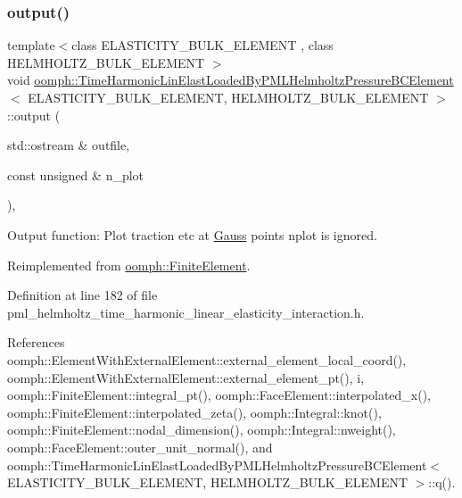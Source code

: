 \subsubsection{\texorpdfstring{output()}{output()}\hspace{0.1cm}{\footnotesize\ttfamily [2/4]}}
{\footnotesize\ttfamily template$<$class E\+L\+A\+S\+T\+I\+C\+I\+T\+Y\+\_\+\+B\+U\+L\+K\+\_\+\+E\+L\+E\+M\+E\+NT , class H\+E\+L\+M\+H\+O\+L\+T\+Z\+\_\+\+B\+U\+L\+K\+\_\+\+E\+L\+E\+M\+E\+NT $>$ \\
void \hyperlink{classoomph_1_1TimeHarmonicLinElastLoadedByPMLHelmholtzPressureBCElement}{oomph\+::\+Time\+Harmonic\+Lin\+Elast\+Loaded\+By\+P\+M\+L\+Helmholtz\+Pressure\+B\+C\+Element}$<$ E\+L\+A\+S\+T\+I\+C\+I\+T\+Y\+\_\+\+B\+U\+L\+K\+\_\+\+E\+L\+E\+M\+E\+NT, H\+E\+L\+M\+H\+O\+L\+T\+Z\+\_\+\+B\+U\+L\+K\+\_\+\+E\+L\+E\+M\+E\+NT $>$\+::output (\begin{DoxyParamCaption}\item[{std\+::ostream \&}]{outfile,  }\item[{const unsigned \&}]{n\+\_\+plot }\end{DoxyParamCaption})\hspace{0.3cm}{\ttfamily [inline]}, {\ttfamily [virtual]}}



Output function\+: Plot traction etc at \hyperlink{classoomph_1_1Gauss}{Gauss} points nplot is ignored. 



Reimplemented from \hyperlink{classoomph_1_1FiniteElement_afa9d9b2670f999b43e6679c9dd28c457}{oomph\+::\+Finite\+Element}.



Definition at line 182 of file pml\+\_\+helmholtz\+\_\+time\+\_\+harmonic\+\_\+linear\+\_\+elasticity\+\_\+interaction.\+h.



References oomph\+::\+Element\+With\+External\+Element\+::external\+\_\+element\+\_\+local\+\_\+coord(), oomph\+::\+Element\+With\+External\+Element\+::external\+\_\+element\+\_\+pt(), i, oomph\+::\+Finite\+Element\+::integral\+\_\+pt(), oomph\+::\+Face\+Element\+::interpolated\+\_\+x(), oomph\+::\+Finite\+Element\+::interpolated\+\_\+zeta(), oomph\+::\+Integral\+::knot(), oomph\+::\+Finite\+Element\+::nodal\+\_\+dimension(), oomph\+::\+Integral\+::nweight(), oomph\+::\+Face\+Element\+::outer\+\_\+unit\+\_\+normal(), and oomph\+::\+Time\+Harmonic\+Lin\+Elast\+Loaded\+By\+P\+M\+L\+Helmholtz\+Pressure\+B\+C\+Element$<$ E\+L\+A\+S\+T\+I\+C\+I\+T\+Y\+\_\+\+B\+U\+L\+K\+\_\+\+E\+L\+E\+M\+E\+N\+T, H\+E\+L\+M\+H\+O\+L\+T\+Z\+\_\+\+B\+U\+L\+K\+\_\+\+E\+L\+E\+M\+E\+N\+T $>$\+::q().

